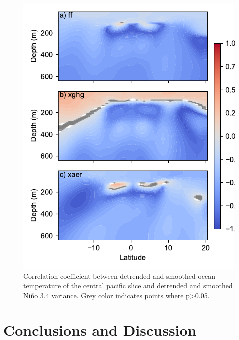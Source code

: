 \documentclass[11pt]{article}
\begin{document}
\begin{figure}[htbp]
\centering
\includegraphics[width=.9\linewidth]{./figures/tempcep.pdf}
\caption{\label{fig:tempdt}Correlation coefficient between detrended and smoothed ocean temperature of the central pacific slice and detrended and smoothed Niño 3.4 variance. Grey color indicates points where p>0.05.}
\end{figure}

\section{Conclusions and Discussion}
\label{sec:org1483582}
\end{document}

